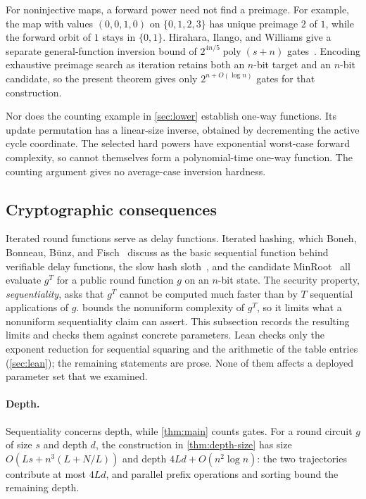 \documentclass[11pt]{article}
\theoremstyle{definition}
\theoremstyle{remark}
\newcommand{\poly}{\operatorname{poly}}
\numberwithin{equation}{section}
\begin{document}
For noninjective maps, a forward power need not find a preimage.  For
example, the map with values $(0,0,1,0)$ on $\{0,1,2,3\}$ has unique
preimage $2$ of $1$, while the forward orbit of $1$ stays in $\{0,1\}$.
Hirahara, Ilango, and Williams give a separate general-function inversion
bound of $2^{4n/5}\poly(s+n)$ gates~\cite[Theorem~3.5]{HIW24}.
Encoding exhaustive preimage search as iteration retains both an $n$-bit
target and an $n$-bit candidate, so the present theorem gives only
$2^{n+O(\log n)}$ gates for that construction.

Nor does the counting example in \cref{sec:lower} establish one-way
functions.  Its update permutation has a linear-size inverse, obtained
by decrementing the active cycle coordinate.  The selected hard powers
have exponential worst-case forward complexity, so cannot themselves
form a polynomial-time one-way function.  The counting argument gives
no average-case inversion hardness.

\subsection{Cryptographic consequences}\label{sec:crypto}

Iterated round functions serve as delay functions.  Iterated hashing,
which Boneh, Bonneau, B\"unz, and Fisch~\cite{BBBF18} discuss as the basic
sequential function behind verifiable delay functions, the slow hash
sloth~\cite{LW15}, and the candidate MinRoot~\cite{KMT22} all evaluate
$g^T$ for a public round function $g$ on an $n$-bit state.  The security
property, \emph{sequentiality}, asks
that $g^T$ cannot be computed much faster than by $T$ sequential
applications of $g$.   bounds the nonuniform complexity of
$g^T$, so it limits what a nonuniform sequentiality claim can assert.
This subsection records the resulting limits and checks them against
concrete parameters.  Lean checks only the exponent reduction for
sequential squaring and the arithmetic of the table entries
(\cref{sec:lean}); the remaining statements are prose.  None of them
affects a deployed parameter set that we examined.

\paragraph{Depth.}
Sequentiality concerns depth, while \cref{thm:main} counts gates.
For a round circuit $g$ of size $s$ and depth $d$, the construction in
\cref{thm:depth-size} has size $O(Ls+n^3(L+N/L))$ and depth
$4Ld+O(n^2\log n)$: the two trajectories contribute at most $4Ld$,
and parallel prefix operations and sorting bound the remaining depth.
\end{document}
